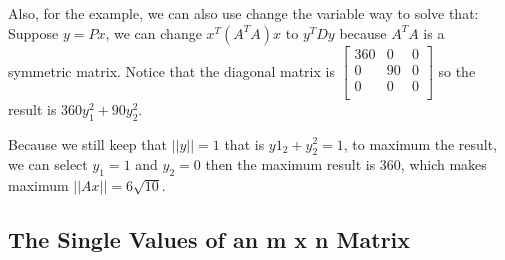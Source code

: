 \begin{remark}
    Also, for the example, we can also use change the variable way to solve that:
    Suppose \(y = Px\), we can change \(x^T(A^TA)x\)  to \(y^TDy\) because \(A^TA\) is a symmetric matrix.  
    Notice that the diagonal matrix is \(\begin{bmatrix}
        360 & 0 &  0 \\
        0 & 90 &  0 \\
        0 & 0 &  0 \\
    \end{bmatrix}\) so the result is \(360y_1^2 + 90y_2^2\). 

    Because we still keep that \(||y|| = 1\) that is \(y1_2 + y_2^2 = 1\), to maximum the result, we can select \(y_1 = 1\) and \(y_2 = 0\) then the maximum result is 360, which makes maximum \(||Ax|| = 6\sqrt{10}\).    
\end{remark}

\subsection{The Single Values of an m x n Matrix}